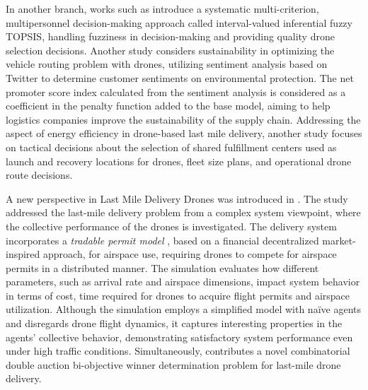
In another branch, works such as  introduce a systematic multi-criterion, multipersonnel decision-making approach called interval-valued inferential fuzzy TOPSIS, handling fuzziness in decision-making and providing quality drone selection decisions. Another study  considers sustainability in optimizing the vehicle routing problem with drones, utilizing sentiment analysis based on Twitter to determine customer sentiments on environmental protection. The net promoter score index calculated from the sentiment analysis is considered as a coefficient in the penalty function added to the base model, aiming to help logistics companies improve the sustainability of the supply chain. Addressing the aspect of energy efficiency in drone-based last mile delivery, another study  focuses on tactical decisions about the selection of shared fulfillment centers used as launch and recovery locations for drones, fleet size plans, and operational drone route decisions. 


A new perspective in Last Mile Delivery Drones was introduced in . The study addressed the last-mile delivery problem from a complex system viewpoint, where the collective performance of the drones is investigated. The delivery system incorporates a \textit{tradable permit model} \cite{AKAMATSU2017178}, based on a financial decentralized market-inspired approach, for airspace use, requiring drones to compete for airspace permits in a distributed manner. The simulation evaluates how different parameters, such as arrival rate and airspace dimensions, impact system behavior in terms of cost, time required for drones to acquire flight permits and airspace utilization. Although the simulation employs a simplified model with naïve agents and disregards drone flight dynamics, it captures interesting properties in the agents' collective behavior, demonstrating satisfactory system performance even under high traffic conditions. Simultaneously,  contributes a novel combinatorial double auction bi-objective winner determination problem for last-mile drone delivery. 

